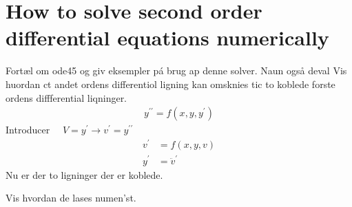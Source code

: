 \section{How to solve second order differential equations numerically}

Fortæl om ode45 og giv eksempler pá brug ap denne solver. Naun også deval
Vis huordan ct andet ordens differentiol ligning kan omsknies tic to koblede forste ordens diffferential liqninger.
\begin{align*}
y^{\prime \prime}=f\left(x, y, y^{\prime}\right)
\end{align*}
Introducer \(\quad V=y^{\prime} \rightarrow v^{\prime}=y^{\prime \prime}\)
\begin{align*}
v^{\prime}&=f(x, y, v) \\
y^{\prime}&=\ddot{v}^{\prime}
\end{align*}
Nu er der to ligninger der er koblede.

Vis hvordan de lases numen'st.
 